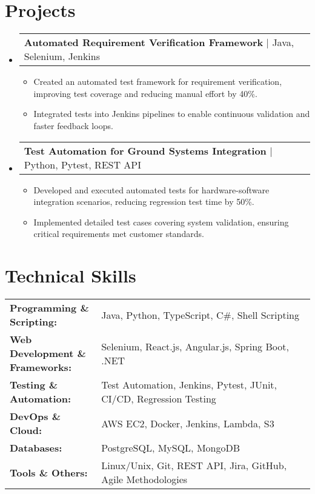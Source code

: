 \documentclass[letterpaper,11pt]{article}
\makeatletter
\newcommand{\resumeItem}[1]{
  \item\footnotesize{
    {#1 \vspace{-2pt}}
  }
}
\newcommand{\resumeProjectHeading}[2]{
    \item
    \begin{tabular*}{1.001\textwidth}{l@{\extracolsep{\fill}}r}
      \small#1 & \textbf{\small #2}\\
    \end{tabular*}\vspace{-7pt}
}
\newcommand{\resumeSubHeadingListStart}{\begin{itemize}[leftmargin=0pt, label={}]}
\newcommand{\resumeSubHeadingListEnd}{\end{itemize}}
\newcommand{\resumeItemListStart}{\begin{itemize}[leftmargin=*]}
\newcommand{\resumeItemListEnd}{\end{itemize}\vspace{-5pt}}
\makeatother
\begin{document}
\section{Projects}
    \vspace{-5pt}
    \resumeSubHeadingListStart
      \resumeProjectHeading
          {\textbf{Automated Requirement Verification Framework} | Java, Selenium, Jenkins}
          {}
          \resumeItemListStart
              \resumeItem{Created an automated test framework for requirement verification, improving test coverage and reducing manual effort by 40\%.}
              \resumeItem{Integrated tests into Jenkins pipelines to enable continuous validation and faster feedback loops.}
          \resumeItemListEnd
          \vspace{-16pt}
      \resumeProjectHeading
          {\textbf{Test Automation for Ground Systems Integration} | Python, Pytest, REST API}
          {}
          \resumeItemListStart
              \resumeItem{Developed and executed automated tests for hardware-software integration scenarios, reducing regression test time by 50\%.}
              \resumeItem{Implemented detailed test cases covering system validation, ensuring critical requirements met customer standards.}
          \resumeItemListEnd
          \vspace{-16pt}
    \resumeSubHeadingListEnd
\vspace{-10pt}
\section{Technical Skills}
        \vspace{-14pt}
        \begin{table}[h]
            \footnotesize
            \begin{tabular}{p{0.3\linewidth} p{0.7\linewidth}}
                \textbf{Programming \& Scripting:} & Java, Python, TypeScript, C\#, Shell Scripting \\
                \textbf{Web Development \& Frameworks:} & Selenium, React.js, Angular.js, Spring Boot, .NET \\
                \textbf{Testing \& Automation:} & Test Automation, Jenkins, Pytest, JUnit, CI/CD, Regression Testing \\
                \textbf{DevOps \& Cloud:} & AWS EC2, Docker, Jenkins, Lambda, S3 \\
                \textbf{Databases:} & PostgreSQL, MySQL, MongoDB \\
                \textbf{Tools \& Others:} & Linux/Unix, Git, REST API, Jira, GitHub, Agile Methodologies \\
            \end{tabular}
        \end{table}
\end{document}
